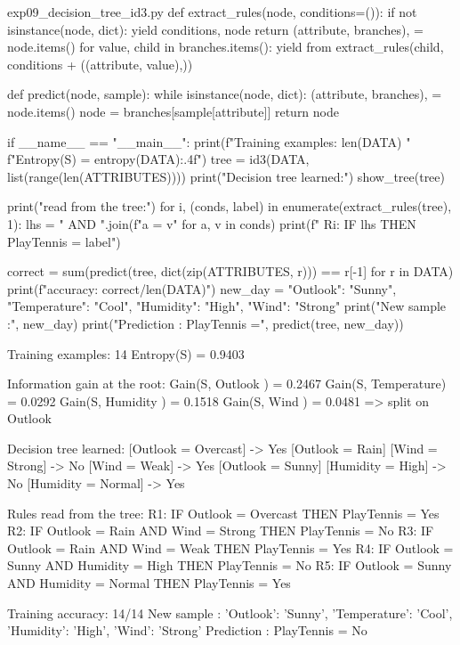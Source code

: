 \documentclass[11pt,a4paper]{article}
\begin{document}
\begin{pycode}{exp09\_decision\_tree\_id3.py}
def extract_rules(node, conditions=()):
    if not isinstance(node, dict):
        yield conditions, node
        return
    (attribute, branches), = node.items()
    for value, child in branches.items():
        yield from extract_rules(child, conditions + ((attribute, value),))


def predict(node, sample):
    while isinstance(node, dict):
        (attribute, branches), = node.items()
        node = branches[sample[attribute]]
    return node


if __name__ == "__main__":
    print(f"Training examples: {len(DATA)}   "
          f"Entropy(S) = {entropy(DATA):.4f}\n")
    tree = id3(DATA, list(range(len(ATTRIBUTES))))
    print("Decision tree learned:")
    show_tree(tree)

    print("\nRules read from the tree:")
    for i, (conds, label) in enumerate(extract_rules(tree), 1):
        lhs = " AND ".join(f"{a} = {v}" for a, v in conds)
        print(f"   R{i}: IF {lhs} THEN PlayTennis = {label}")

    correct = sum(predict(tree, dict(zip(ATTRIBUTES, r))) == r[-1] for r in DATA)
    print(f"\nTraining accuracy: {correct}/{len(DATA)}")
    new_day = {"Outlook": "Sunny", "Temperature": "Cool",
               "Humidity": "High", "Wind": "Strong"}
    print("New sample :", new_day)
    print("Prediction : PlayTennis =", predict(tree, new_day))
\end{pycode}

\begin{outputbox}
Training examples: 14   Entropy(S) = 0.9403

Information gain at the root:
   Gain(S, Outlook    ) = 0.2467
   Gain(S, Temperature) = 0.0292
   Gain(S, Humidity   ) = 0.1518
   Gain(S, Wind       ) = 0.0481
   => split on Outlook

Decision tree learned:
   [Outlook = Overcast]
       -> Yes
   [Outlook = Rain]
       [Wind = Strong]
           -> No
       [Wind = Weak]
           -> Yes
   [Outlook = Sunny]
       [Humidity = High]
           -> No
       [Humidity = Normal]
           -> Yes

Rules read from the tree:
   R1: IF Outlook = Overcast THEN PlayTennis = Yes
   R2: IF Outlook = Rain AND Wind = Strong THEN PlayTennis = No
   R3: IF Outlook = Rain AND Wind = Weak THEN PlayTennis = Yes
   R4: IF Outlook = Sunny AND Humidity = High THEN PlayTennis = No
   R5: IF Outlook = Sunny AND Humidity = Normal THEN PlayTennis = Yes

Training accuracy: 14/14
New sample : {'Outlook': 'Sunny', 'Temperature': 'Cool', 'Humidity': 'High', 'Wind': 'Strong'}
Prediction : PlayTennis = No
\end{outputbox}
\end{document}
